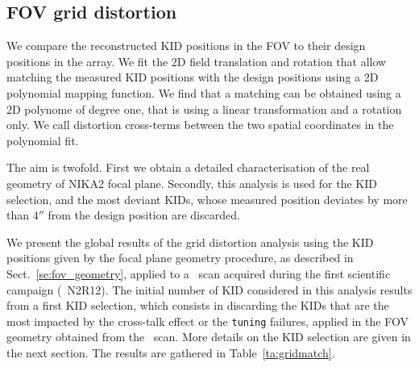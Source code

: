 \subsection{FOV grid distortion}
\label{se:grid_distortion}

We compare the reconstructed KID positions in the FOV to their design
positions in the array. We fit the 2D field translation and rotation that allow
matching the measured KID positions with the design positions using a 2D
polynomial mapping function. {\lp We find that a matching can be
obtained using a 2D polynome of degree one, that is using a linear
transformation and a rotation only.} We call distortion cross-terms
between the two spatial coordinates in the polynomial fit.

The aim is twofold. First we obtain a detailed
characterisation of the real geometry of NIKA2 focal plane. Secondly,
{\lp this analysis is used for the KID
selection}, and the most deviant KIDs, whose measured position deviates
by more than $4''$ from the design position are discarded. 

We present the global results of the grid distortion
analysis using the KID positions given
by the focal plane geometry procedure, as described in
Sect.~\ref{se:fov_geometry}, applied to a \bm\ scan acquired
during the first scientific campaign (\aka\ N2R12). 
The initial
number of KID considered in this analysis results from
a first KID selection, which consists in discarding the KIDs that are the most
impacted by the cross-talk effect or the {\tt tuning} failures,
applied in the FOV geometry obtained from the \bm\ scan. More details
on the KID selection are given in the next section. %
The results are gathered in Table~\ref{ta:gridmatch}.


